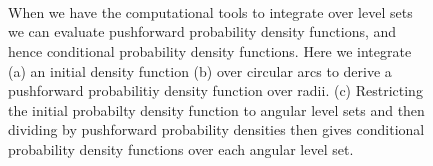 \documentclass[
  letterpaper,
  DIV=11,
  numbers=noendperiod]{scrartcl}
\begin{document}
\begin{figure}
\begin{minipage}{0.45\linewidth}
{}

\subcaption{\label{fig-radial-pushforward}}

\end{minipage}%
%
\begin{minipage}{0.05\linewidth}
~\end{minipage}%
\newline
\begin{minipage}{0.28\linewidth}
~\end{minipage}%
%
\begin{minipage}{0.45\linewidth}


\subcaption{\label{fig-radial-conditional}}

\end{minipage}%
%
\begin{minipage}{0.28\linewidth}
~\end{minipage}%

\caption{\label{fig-radial}When we have the computational tools to
integrate over level sets we can evaluate pushforward probability
density functions, and hence conditional probability density functions.
Here we integrate (a) an initial density function (b) over circular arcs
to derive a pushforward probabilitiy density function over radii. (c)
Restricting the initial probabilty density function to angular level
sets and then dividing by pushforward probability densities then gives
conditional probability density functions over each angular level set.}

\end{figure}%
\end{document}
